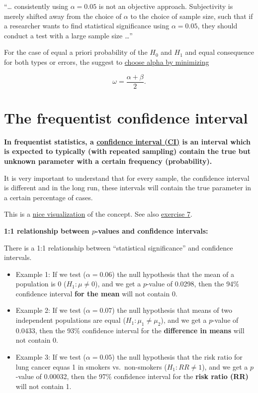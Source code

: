 \documentclass[
]{book}
\begin{document}
``\ldots{} consistently using \(\alpha = 0.05\) is not an objective approach. Subjectivity is
merely shifted away from the choice of \(\alpha\) to the choice of sample size, such
that if a researcher wants to find statistical significance using \(\alpha = 0.05\),
they should conduct a test with a large sample size \ldots{}''

For the case of equal a priori probability of the \(H_0\) and \(H_1\) and equal consequence
for both types or errors, the suggest to \href{https://journals.plos.org/plosone/article/figure?id=10.1371/journal.pone.0032734.g002}{choose alpha by minimizing}

\[\omega = \frac{\alpha + \beta}{2}.\]

\section{The frequentist confidence interval}\label{the-frequentist-confidence-interval}

\textbf{In frequentist statistics, a \href{https://en.wikipedia.org/wiki/Confidence_interval}{confidence interval (CI)} is an interval which is expected to
typically (with repeated sampling) contain the true but unknown parameter with a certain frequency (probability).}

It is very important to understand that for every sample, the confidence interval is different and in the long run,
these intervals will contain the true parameter in a certain percentage of cases.

This is a \href{https://en.wikipedia.org/wiki/Confidence_interval\#/media/File:Normal_distribution_50\%25_CI_illustration.svg}{nice visualization}
of the concept.
See also \hyperref[exercise7_nhst]{exercise 7}.

\textbf{1:1 relationship between \(p\)-values and confidence intervals:}

There is a 1:1 relationship between ``statistical significance'' and confidence intervals.

\begin{itemize}
\item
  Example 1: If we test (\(\alpha = 0.06\)) the null hypothesis that the mean of a population
  is 0 (\(H_1: \mu \ne 0\)),
  and we get a \(p\)-value of 0.0298, then the 94\% confidence interval \textbf{for the mean}
  will not contain 0.
\item
  Example 2: If we test (\(\alpha = 0.07\)) the null hypothesis that means of two independent
  populations are equal (\(H_1: \mu_1 \ne \mu_2\)), and we get a \(p\)-value of 0.0433,
  then the 93\% confidence interval for the \textbf{difference in means} will not contain 0.
\item
  Example 3: If we test (\(\alpha = 0.05\)) the null hypothesis that the risk ratio for
  lung cancer equas 1 in smokers vs.~non-smokers (\(H_1: RR \ne 1\)), and we get a
  \(p\)-value of 0.00032, then the 97\% confidence interval for the \textbf{risk ratio (RR)}
  will not contain 1.
\end{itemize}
\end{document}
